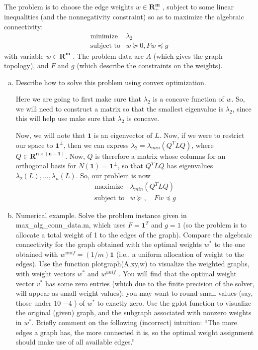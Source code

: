 \documentclass{article}
\begin{document}
The problem is to choose the edge weights $w \in \mathbf{R^{m}_{+}}$ , subject to some linear inequalities (and the
nonnegativity constraint) so as to maximize the algebraic connectivity:
\begin{eqnarray*}
\mbox{minimize} & \lambda_{2}\\
\mbox{subject to} & w \succeq 0, Fw \preceq g
\end{eqnarray*}
with variable $w \in \mathbf{R^{m}}$ . The problem data are $A$ (which gives the graph topology), and $F$ and $g$
(which describe the constraints on the weights).
\begin{enumerate}[(a)]
\item{Describe how to solve this problem using convex optimization.

Here we are going to first make sure that $\lambda_{2}$ is a concave function of $w$. So, we will need to construct a matrix so that the smallest eigenvalue is $\lambda_{2}$, since this will help use make sure that $\lambda_{2}$ is concave.

Now, we will note that $\mathbf{1}$ is an eigenvector of $L$. Now, if we were to restrict our space to $\mathbf{1}^{\perp}$, then we can express $\lambda_{2} = \lambda_{min}(Q^{T}LQ)$, where $Q \in \mathbf{R^{n \times (n-1)}}$.  Now, $Q$ is therefore a matrix whose columns for an orthogonal basis for $N(\mathbf{1}) = \mathbf{1^{\perp}}$, so that $Q^{T}LQ$ has eigenvalues $\lambda_{2}(L),\ldots,\lambda_{n}(L)$.  So, our problem is now
\begin{eqnarray*}
\mbox{maximize} & \lambda_{min}(Q^{T}LQ)\\
\mbox{subject to} & w \succeq, \quad Fw \preceq g
\end{eqnarray*}}

\item{Numerical example. Solve the problem instance given in max\_alg\_conn\_data.m, which uses
$F = \mathbf{1}^{T}$ and $g = 1$ (so the problem is to allocate a total weight of 1 to the edges of the graph).
Compare the algebraic connectivity for the graph obtained with the optimal weights $w^{*}$ to the
one obtained with $w^{unif} = (1/m)\mathbf{1}$ (i.e., a uniform allocation of weight to the edges).
Use the function plotgraph(A,xy,w) to visualize the weighted graphs, with weight vectors
$w^{*}$ and $w^{unif}$ . You will find that the optimal weight vector $v^{*}$ has some zero entries (which
due to the finite precision of the solver, will appear as small weight values); you may want to
round small values (say, those under 10 −4 ) of $w^{*}$ to exactly zero. Use the gplot function to
visualize the original (given) graph, and the subgraph associated with nonzero weights in $w^{*}$.
Briefly comment on the following (incorrect) intuition: “The more edges a graph has, the more
connected it is, so the optimal weight assignment should make use of all available edges.”}
\end{enumerate}
\end{document}
